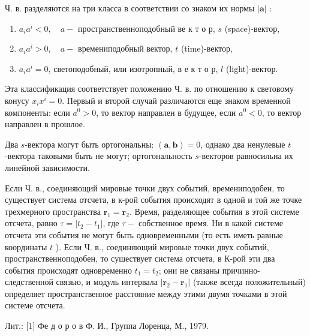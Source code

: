 \documentclass[10pt]{article}
\begin{document}
Ч. в. разделяются на три класса в соответствии со знаком их нормы $|\boldsymbol{a}|$ :



\begin{enumerate}

  \item $a_{i} a^{i}<0, \quad a-$ пространственноподобный ве к т о р, $s$ (space)-вектор,



  \item $a_{i} a^{i}>0, \quad a-$ времениподобный вектор, $t$ (time)-вектор,



  \item $a_{i} a^{i}=0$, светоподобный, или изотропный, в е к т о р, $l$ (light)-вектор.



\end{enumerate}



Эта классификация соответствует положению Ч. в. по отношению к световому конусу $x_{i} x^{i}=0$. Первый и второй случай различаются еще знаком временной компоненты: если $a^{0}>0$, то вектор направлен в будущее, если $a^{0}<0$, то вектор направлен в прошлое.



Два $s$-вектора могут быть ортогональны: $(\boldsymbol{a}, \boldsymbol{b})=0$, однако два ненулевые $t$-вектора таковыми быть не могут; ортогональность $s$-векторов равносильна их линейной зависимости.



Если Ч. в., соединяющий мировые точки двух событий, времениподобен, то существует система отсчета, в к-рой события происходят в одной и той же точке трехмерного пространства $\boldsymbol{r}_{1}=\boldsymbol{r}_{2}$. Время, разделяющее события в этой системе отсчета, равно $\tau=\left|t_{2}-t_{1}\right|$, где $\tau-$ собственное время. Ни в какой системе отсчета эти события не могут быть одновременными (то есть иметь равные координаты $t$ ). Если Ч. в., соединяющий мировые точки двух событий, пространственноподобен, то сушествует система отсчета, в К-рой эти два события происходят одновременно $t_{1}=t_{2}$; они не связаны причинно-следственной связью, и модуль интервала $\left|\boldsymbol{r}_{2}-\boldsymbol{r}_{1}\right|$ (также всегда положительный) определяет пространственное расстояние между этими двумя точками в этой системе отсчета.



Лит.: [1] Фе д о р о в Ф. И., Группа Лоренца, М., 1979.
\end{document}
